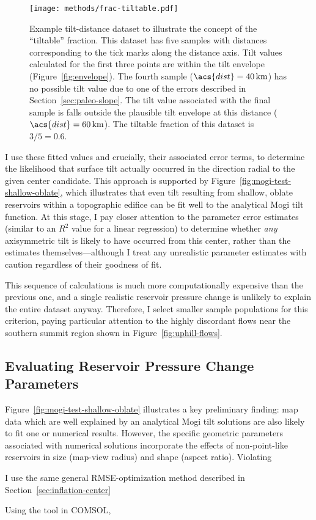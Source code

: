 \begin{figure}
    \texttt{[image: methods/frac-tiltable.pdf]}%
    \caption[``Tiltable'' fraction]{Example tilt-distance dataset to illustrate the concept of the ``tiltable'' fraction. This dataset has five samples with distances corresponding to the tick marks along the distance axis. Tilt values calculated for the first three points are within the tilt envelope (Figure~\ref{fig:envelope}). The fourth sample ($\acs{dist} = \qty{40}{\km}$) has no possible tilt value due to one of the errors described in Section~\ref{sec:paleo-slope}. The tilt value associated with the final sample is falls outside the plausible tilt envelope at this distance ($\acs{dist} = \qty{60}{\km}$). The tiltable fraction of this dataset is $3/5 = 0.6$.}%
    \label{fig:frac-tiltable}
\end{figure}

I use these fitted values and crucially, their associated error terms, to determine the likelihood that surface tilt actually occurred in the direction radial to the given center candidate. This approach is supported by Figure~\ref{fig:mogi-test-shallow-oblate}, which illustrates that even tilt resulting from shallow, oblate reservoirs within a topographic edifice can be fit well to the analytical Mogi tilt function. At this stage, I pay closer attention to the parameter error estimates (similar to an $R^2$ value for a linear regression) to determine whether \emph{any} axisymmetric tilt is likely to have occurred from this center, rather than the estimates themselves---although I treat any unrealistic parameter estimates with caution regardless of their goodness of fit.

This sequence of calculations is much more computationally expensive than the previous one, and a single realistic reservoir pressure change is unlikely to explain the entire dataset anyway. Therefore, I select smaller sample populations for this criterion, paying particular attention to the highly discordant flows near the southern summit region shown in Figure~\ref{fig:uphill-flows}.

\subsection{Evaluating Reservoir Pressure Change Parameters}

Figure~\ref{fig:mogi-test-shallow-oblate} illustrates a key preliminary finding: map data which are well explained by an analytical Mogi tilt solutions are also likely to fit one or numerical results. However, the specific geometric parameters associated with numerical solutions incorporate the effects of non-point-like reservoirs in size (map-view radius) and shape (aspect ratio). Violating 

I use the same general \acs{RMSE}-optimization method described in Section~\ref{sec:inflation-center} 

Using the  tool in COMSOL, 